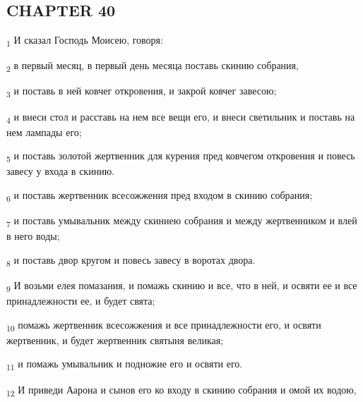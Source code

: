 \subsection{CHAPTER 40}
\begin{tcolorbox}
\textsubscript{1} И сказал Господь Моисею, говоря:
\end{tcolorbox}
\begin{tcolorbox}
\textsubscript{2} в первый месяц, в первый день месяца поставь скинию собрания,
\end{tcolorbox}
\begin{tcolorbox}
\textsubscript{3} и поставь в ней ковчег откровения, и закрой ковчег завесою;
\end{tcolorbox}
\begin{tcolorbox}
\textsubscript{4} и внеси стол и расставь на нем все вещи его, и внеси светильник и поставь на нем лампады его;
\end{tcolorbox}
\begin{tcolorbox}
\textsubscript{5} и поставь золотой жертвенник для курения пред ковчегом откровения и повесь завесу у входа в скинию.
\end{tcolorbox}
\begin{tcolorbox}
\textsubscript{6} и поставь жертвенник всесожжения пред входом в скинию собрания;
\end{tcolorbox}
\begin{tcolorbox}
\textsubscript{7} и поставь умывальник между скиниею собрания и между жертвенником и влей в него воды;
\end{tcolorbox}
\begin{tcolorbox}
\textsubscript{8} и поставь двор кругом и повесь завесу в воротах двора.
\end{tcolorbox}
\begin{tcolorbox}
\textsubscript{9} И возьми елея помазания, и помажь скинию и все, что в ней, и освяти ее и все принадлежности ее, и будет свята;
\end{tcolorbox}
\begin{tcolorbox}
\textsubscript{10} помажь жертвенник всесожжения и все принадлежности его, и освяти жертвенник, и будет жертвенник святыня великая;
\end{tcolorbox}
\begin{tcolorbox}
\textsubscript{11} и помажь умывальник и подножие его и освяти его.
\end{tcolorbox}
\begin{tcolorbox}
\textsubscript{12} И приведи Аарона и сынов его ко входу в скинию собрания и омой их водою,
\end{tcolorbox}
